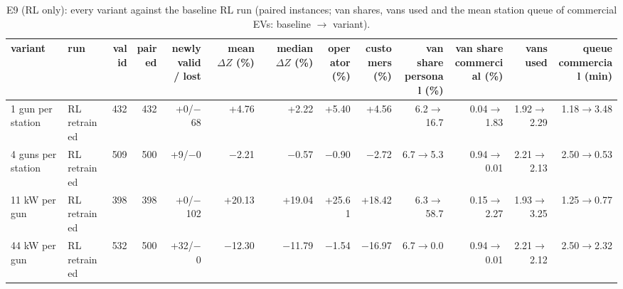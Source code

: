 \begin{table}[H]\centering
\scriptsize
\caption{E9 (RL only): every variant against the baseline RL run (paired instances; van shares, vans used and the mean station queue of commercial EVs: baseline $\to$ variant).}\label{tab:expE9}
\begin{adjustbox}{max width=\textwidth}\begin{tabular}{llrrrrrrrrrrr}\toprule
variant & run & valid & paired & \shortstack{newly valid\\/ lost} & \shortstack{mean\\$\Delta Z$ (\%)} & \shortstack{median\\$\Delta Z$ (\%)} & \shortstack{operator\\(\%)} & \shortstack{customers\\(\%)} & \shortstack{van share\\personal (\%)} & \shortstack{van share\\commercial (\%)} & vans used & \shortstack{queue\\commercial (min)} \\ \midrule
1 gun per station & RL retrained & 432 & 432 & +0/$-$68 & +4.76 & +2.22 & +5.40 & +4.56 & 6.2$\to$16.7 & 0.04$\to$1.83 & 1.92$\to$2.29 & 1.18$\to$3.48 \\
4 guns per station & RL retrained & 509 & 500 & +9/$-$0 & $-$2.21 & $-$0.57 & $-$0.90 & $-$2.72 & 6.7$\to$5.3 & 0.94$\to$0.01 & 2.21$\to$2.13 & 2.50$\to$0.53 \\
11 kW per gun & RL retrained & 398 & 398 & +0/$-$102 & +20.13 & +19.04 & +25.61 & +18.42 & 6.3$\to$58.7 & 0.15$\to$2.27 & 1.93$\to$3.25 & 1.25$\to$0.77 \\
44 kW per gun & RL retrained & 532 & 500 & +32/$-$0 & $-$12.30 & $-$11.79 & $-$1.54 & $-$16.97 & 6.7$\to$0.0 & 0.94$\to$0.01 & 2.21$\to$2.12 & 2.50$\to$2.32 \\
\bottomrule\end{tabular}\end{adjustbox}\end{table}
